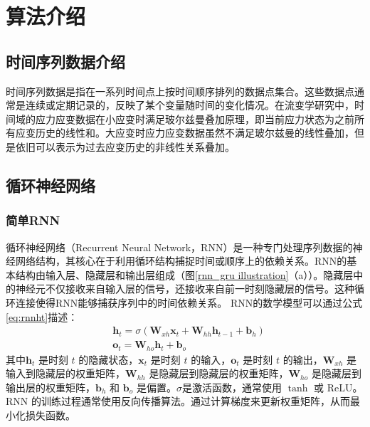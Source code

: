 \section{算法介绍}
\subsection{时间序列数据介绍}
时间序列数据是指在一系列时间点上按时间顺序排列的数据点集合。这些数据点通常是连续或定期记录的，反映了某个变量随时间的变化情况。在流变学研究中，时间域的应力应变数据在小应变时满足玻尔兹曼叠加原理，即当前应力状态为之前所有应变历史的线性和\cite{boltzmannZurTheorieElastischen1878}。大应变时应力应变数据虽然不满足玻尔兹曼的线性叠加，但是依旧可以表示为过去应变历史的非线性关系叠加。

\subsection{循环神经网络}
\subsubsection{简单RNN}
循环神经网络（Recurrent Neural Network，RNN）是一种专门处理序列数据的神经网络结构，其核心在于利用循环结构捕捉时间或顺序上的依赖关系\cite{elmanFindingStructureTime1990}。RNN的基本结构由输入层、隐藏层和输出层组成（图\ref{rnn_gru illustration}（a））。隐藏层中的神经元不仅接收来自输入层的信号，还接收来自前一时刻隐藏层的信号。这种循环连接使得RNN能够捕获序列中的时间依赖关系。
RNN的数学模型可以通过公式\eqref{eq:rnnht}描述：
\begin{align}
   & \mathbf{h}_t = \sigma(\mathbf{W}_{xh} \mathbf{x}_t + \mathbf{W}_{hh} \mathbf{h}_{t-1} + \mathbf{b}_h) \label{eq:rnnht} \\
   & {\mathbf{o}_t = \mathbf{W}_{ho} \mathbf{h}_t + \mathbf{b}_o} \label{eq:rnnot}
\end{align}
其中$\mathbf{h}_t$ 是时刻 $t$ 的隐藏状态，$\mathbf{x}_t$ 是时刻 $t$ 的输入，$\mathbf{o}_t$ 是时刻 $t$ 的输出，$\mathbf{W}_{xh}$ 是输入到隐藏层的权重矩阵，$\mathbf{W}_{hh}$ 是隐藏层到隐藏层的权重矩阵，$\mathbf{W}_{ho}$ 是隐藏层到输出层的权重矩阵，$\mathbf{b}_h$ 和 $\mathbf{b}_o$ 是偏置。$\sigma$是激活函数，通常使用 $\tanh$ 或 $\text{ReLU}$。RNN 的训练过程通常使用反向传播算法。通过计算梯度来更新权重矩阵，从而最小化损失函数。

